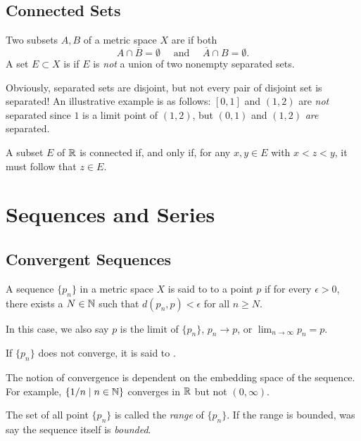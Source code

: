 \documentclass{article}
\begin{document}
\subsection{Connected Sets}
\begin{definition}
    Two subsets $A,B$ of a metric space $X$ are  if both \[A\cap \overline{B}=\emptyset\quad\textrm{ and }\quad\overline{A}\cap B=\emptyset.\]A set $E\subset X$ is  if $E$ is \textit{not} a union of two nonempty separated sets. 
\end{definition}    
\begin{remark}
    Obviously, separated sets are disjoint, but not every pair of disjoint set is separated! An illustrative example is as follows: $[0,1]$ and $(1,2)$ are \textit{not} separated since $1$ is a limit point of $(1,2)$, but $(0,1)$ and $(1,2)$ \textit{are} separated.
\end{remark}
\begin{theorem}
    A subset $E$ of $\mathbb R$ is connected if, and only if, for any $x,y\in E$ with $x<z<y$, it must follow that $z\in E$.
\end{theorem}
\newpage



\section{Sequences and Series}
\subsection{Convergent Sequences}
\begin{definition}
    A sequence $\{p_{n}\}$ in a metric space $X$ is said to  to a point $p$ if for every $\epsilon>0$, there exists a $N\in\mathbb N$ such that $d(p_{n},p)<\epsilon$ for all $n\geq N$.

    In this case, we also say $p$ is the limit of $\{p_{n}\}$, $p_{n}\rightarrow p$, or $\lim_{n\rightarrow\infty}p_{n}=p$. 

    If $\{p_{n}\}$ does not converge, it is said to .
\end{definition}
\begin{remark}
    The notion of convergence is dependent on the embedding space of the sequence. For example, $\{1/n\mid n\in\mathbb N\}$ converges in $\mathbb R$ but not $(0,\infty)$.
\end{remark}
The set of all point $\{p_{n}\}$ is called the \emph{range} of $\{p_{n }\}$. If the range is bounded, was say the sequence itself is \textit{bounded}.
\end{document}
